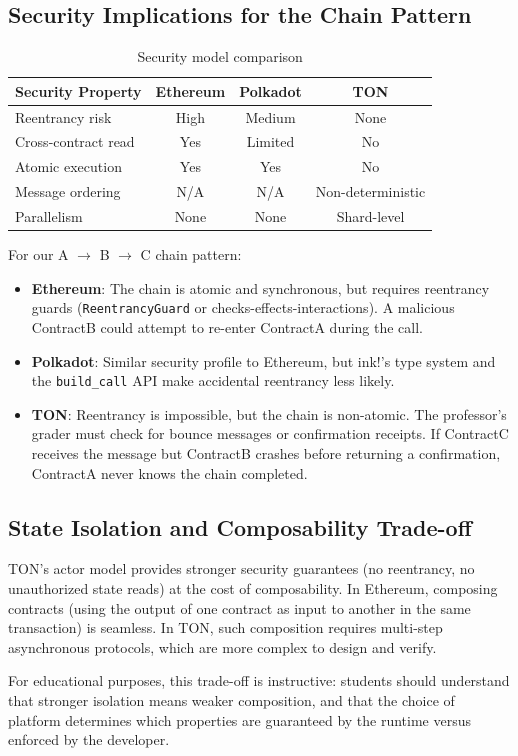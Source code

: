 \subsection{Security Implications for the Chain Pattern}

\begin{table}[h]
\centering
\begin{tabular}{|l|c|c|c|}
\hline
\textbf{Security Property} & \textbf{Ethereum} & \textbf{Polkadot} & \textbf{TON} \\
\hline
Reentrancy risk & High & Medium & None \\
Cross-contract read & Yes & Limited & No \\
Atomic execution & Yes & Yes & No \\
Message ordering & N/A & N/A & Non-deterministic \\
Parallelism & None & None & Shard-level \\
\hline
\end{tabular}
\caption{Security model comparison}
\end{table}

For our A $\to$ B $\to$ C chain pattern:

\begin{itemize}
    \item \textbf{Ethereum}: The chain is atomic and synchronous, but requires
          reentrancy guards (\texttt{ReentrancyGuard} or checks-effects-interactions).
          A malicious ContractB could attempt to re-enter ContractA during the call.
    \item \textbf{Polkadot}: Similar security profile to Ethereum, but ink!'s
          type system and the \texttt{build\_call} API make accidental reentrancy
          less likely.
    \item \textbf{TON}: Reentrancy is impossible, but the chain is non-atomic.
          The professor's grader must check for bounce messages or confirmation
          receipts. If ContractC receives the message but ContractB crashes before
          returning a confirmation, ContractA never knows the chain completed.
\end{itemize}

\subsection{State Isolation and Composability Trade-off}

TON's actor model provides stronger security guarantees (no reentrancy, no
unauthorized state reads) at the cost of composability. In Ethereum, composing
contracts (using the output of one contract as input to another in the same
transaction) is seamless. In TON, such composition requires multi-step
asynchronous protocols, which are more complex to design and verify.

For educational purposes, this trade-off is instructive: students should
understand that stronger isolation means weaker composition, and that the choice
of platform determines which properties are guaranteed by the runtime versus
enforced by the developer.